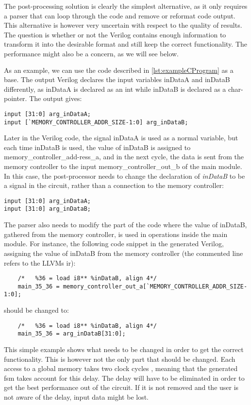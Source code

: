 The post-processing solution is clearly the simplest alternative, as it only requires a parser that can loop through the code and remove or reformat code output. This alternative is however very uncertain with respect to the quality of results. The question is whether or not the Verilog contains enough information to transform it into the desirable format and still keep the correct functionality. The performance might also be a concern, as we will see below.

As an example, we can use the code described in \cref{lst:exampleCProgram} as a base. The output Verilog declares the input variables inDataA and inDataB differently, as inDataA is declared as an int while inDataB is declared as a char-pointer. The output gives:
\lstset{language=Verilog, style=Verilogstyle}
\begin{lstlisting}
input [31:0] arg_inDataA;
input [`MEMORY_CONTROLLER_ADDR_SIZE-1:0] arg_inDataB;
\end{lstlisting}
Later in the Verilog code, the signal inDataA is used as a normal variable, but each time inDataB is used, the value of inDataB is assigned to memory\_controller\_add-ress\_a, and in the next cycle, the data is sent from the memory controller to the input memory\_controller\_out\_b of the main module. In this case, the post-processor needs to change the declaration of \textit{inDataB} to be a signal in the circuit, rather than a connection to the memory controller:
\begin{lstlisting}
input [31:0] arg_inDataA;
input [31:0] arg_inDataB;
\end{lstlisting}
The parser also needs to modify the part of the code where the value of inDataB, gathered from the memory controller, is used in operations inside the main module. For instance, the following code snippet in the generated Verilog, assigning the value of inDataB from the memory controller (the commented line refers to the LLVMs \gls{ir}):
\begin{lstlisting}
	/*   %36 = load i8** %inDataB, align 4*/
	main_35_36 = memory_controller_out_a[`MEMORY_CONTROLLER_ADDR_SIZE-1:0];
\end{lstlisting}
should be changed to:
\begin{lstlisting}
	/*   %36 = load i8** %inDataB, align 4*/
	main_35_36 = arg_inDataB[31:0];
\end{lstlisting}
This simple example shows what needs to be changed in order to get the correct functionality. This is however not the only part that should be changed. Each access to a global memory takes two clock cycles \cite{leguparch}, meaning that the generated \gls{fsm} takes account for this delay. The delay will have to be eliminated in order to get the best performance out of the circuit. If it is not removed and the user is not aware of the delay, input data might be lost.

